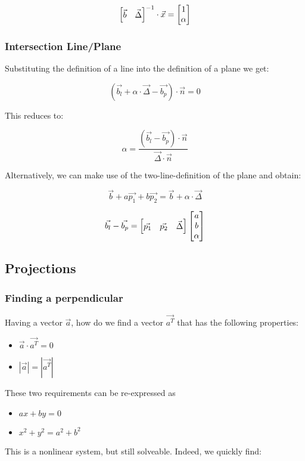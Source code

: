 $$
\begin{bmatrix}
    \vec{b} & \vec{\Delta}
\end{bmatrix}^{-1}
\cdot
\vec{x} = 
 \begin{bmatrix}  1 \\ \alpha  \\ \end{bmatrix} 
$$


\subsubsection{Intersection Line/Plane}

Substituting the definition of a line into the definition of a plane we get:

$$ ( \vec{b_l} + \alpha \cdot \vec{\Delta} - \vec{b_p} )\cdot \vec{n} = 0 $$

This reduces to: 

$$ \alpha = \frac{ ( \vec{b_l} - \vec{b_p} ) \cdot \vec{n} }{ \vec{\Delta} \cdot \vec{n} } $$

Alternatively, we can make use of the two-line-definition of the plane and obtain: 

$$ \vec{b} + a\vec{p_1} + b\vec{p_2} = \vec{b} + \alpha \cdot \vec{\Delta} $$

$$ \vec{b_l} - \vec{b_p} =  \begin{bmatrix}  \vec{p_1} & \vec{p_2} & \vec{\Delta}  \\ \end{bmatrix}   \begin{bmatrix} a \\ b \\ \alpha \\ \end{bmatrix}  $$

\subsection{Projections}

\subsubsection{Finding a perpendicular}

Having a vector $\vec{a}$, how do we find a vector $\vec{a^T}$ that has the following properties:
\begin{itemize}
    \item $ \vec{a} \cdot \vec{a^T} = 0 $
    \item $ | \vec{a} | = | \vec{a^T} | $
\end{itemize}

These two requirements can be re-expressed as 
\begin{itemize}
    \item $ ax + by = 0 $
    \item $ x^2 + y^2 = a^2 + b^2 $
\end{itemize}
This is a nonlinear system, but still solveable. Indeed, we quickly find: 

